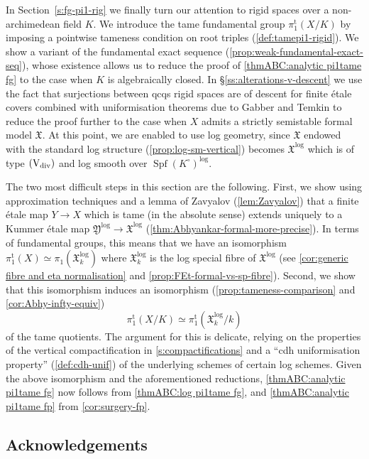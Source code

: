 \documentclass[a4paper,twoside,11pt,reqno]{amsart}
\DeclareRobustCommand{\SkipTocEntry}[5]{}
\newcommand{\fX}{{\mathfrak{X}}}
\newcommand{\fY}{{\mathfrak{Y}}}
\DeclareMathOperator{\Spf}{Spf}
\newcommand{\typeVd}{(\mathrm{V}_{\rm div})}
\newcommand{\pitame}{\pi_1^{\mathrm{t}}}
\theoremstyle{definition}
\numberwithin{equation}{subsection}
\begin{document}
In Section~\ref{s:fg-pi1-rig} we finally turn our attention to rigid spaces over a non-archimedean field $K$. We introduce the tame fundamental group $\pitame(X/K)$ by imposing a pointwise tameness condition on root triples (\cref{def:tamepi1-rigid}). We show a variant of the fundamental exact sequence (\cref{prop:weak-fundamental-exact-seq}), whose existence allows us to reduce the proof of \cref{thmABC:analytic pi1tame fg} to the case when $K$ is algebraically closed. 
In \S\ref{ss:alterations-v-descent} we use the fact that surjections between qcqs rigid spaces are of descent for finite \'etale covers combined with  uniformisation theorems due to Gabber \cite{TravauxGabberIX} and Temkin \cite{Temkin2017:AlteredLocalUniformization} to reduce the proof further to the case when $X$ admits a strictly semistable formal model $\fX$. At this point, we are enabled to use log geometry, since $\fX$ endowed with the standard log structure (\cref{prop:log-sm-vertical}) becomes $\fX^{\log}$ which is of type $\typeVd$ and log smooth over $\Spf(K^\circ)^{\log}$.

The two most difficult steps in this
  section are the following. First, we show using approximation techniques and a lemma of Zavyalov (\cref{lem:Zavyalov}) that a finite \'etale map $Y\to X$ which is tame (in the absolute sense) extends uniquely to a Kummer \'etale map $\fY^{\log} \to \fX^{\log}$ (\cref{thm:Abhyankar-formal-more-precise}). In terms of fundamental groups, this means that we have an isomorphism $\pitame(X) \simeq \pi_1(\fX^{\log}_k)$ where $\fX^{\log}_k$ is the log special fibre of $\fX^{\log}$ (see \cref{cor:generic fibre and eta normalisation} and \cref{prop:FEt-formal-vs-sp-fibre}). 
  Second, we show that this isomorphism induces an isomorphism (\cref{prop:tameness-comparison} and \cref{cor:Abhy-infty-equiv})
\[
    \pitame(X/K) \simeq \pitame(\fX^{\log}_k/k)
\]
of the tame quotients.
The argument for this is delicate, relying on the properties of the vertical compactification in \cref{s:compactifications} and a ``cdh uniformisation property'' (\cref{def:cdh-unif}) of the underlying schemes of certain log schemes. Given the above isomorphism and the aforementioned reductions, \cref{thmABC:analytic pi1tame fg} now follows from \cref{thmABC:log pi1tame fg}, and \cref{thmABC:analytic pi1tame fp} from \cref{cor:surgery-fp}. 


\subsection*{Acknowledgements}
\end{document}
